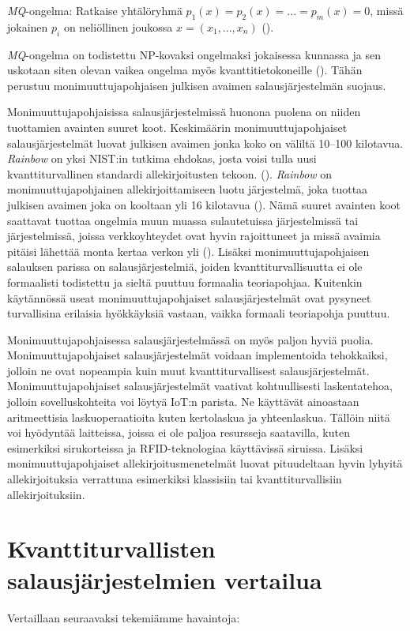 \emph{MQ}-ongelma: Ratkaise yhtälöryhmä $p_{1}(x) = p_{2}(x) = ... = p_ {m}(x) = 0$, missä jokainen $p_{i}$ on neliöllinen joukossa $x = (x_{1}, ..., x_{n})$ (\cite{Ding2009}).

\emph{MQ}-ongelma on todistettu NP-kovaksi ongelmaksi jokaisessa kunnassa ja sen uskotaan siten olevan vaikea ongelma myös kvanttitietokoneille (\cite{8012305}). Tähän perustuu monimuuttujapohjaisen julkisen avaimen salausjärjestelmän suojaus.

Monimuuttujapohjaisissa salausjärjestelmissä huonona puolena on niiden tuottamien avainten suuret koot. Keskimäärin monimuuttujapohjaiset salausjärjestelmät luovat julkisen avaimen jonka koko on väliltä 10--100 kilotavua. \emph{Rainbow} on yksi NIST:in tutkima ehdokas, josta voisi tulla uusi kvanttiturvallinen standardi allekirjoitusten tekoon. (\cite{alagic2020status}). \emph{Rainbow} on monimuuttujapohjainen allekirjoittamiseen luotu järjestelmä, joka tuottaa julkisen avaimen joka on kooltaan yli 16 kilotavua (\cite{Ding2009}). Nämä suuret avainten koot saattavat tuottaa ongelmia muun muassa sulautetuissa järjestelmissä tai järjestelmissä, joissa verkkoyhteydet ovat hyvin rajoittuneet ja missä avaimia pitäisi lähettää monta kertaa verkon yli (\cite{8012305}). Lisäksi monimuuttujapohjaisen salauksen parissa on salausjärjestelmiä, joiden kvanttiturvallisuutta ei ole formaalisti todistettu ja sieltä puuttuu formaalia teoriapohjaa. Kuitenkin käytännössä useat monimuuttujapohjaiset salausjärjestelmät ovat pysyneet turvallisina erilaisia hyökkäyksiä vastaan, vaikka formaali teoriapohja puuttuu.

Monimuuttujapohjaisessa salausjärjestelmässä on myös paljon hyviä puolia. Monimuuttujapohjaiset salausjärjestelmät voidaan implementoida tehokkaiksi, jolloin ne ovat nopeampia kuin muut kvanttiturvallisest salausjärjestelmät. Monimuuttujapohjaiset salausjärjestelmät vaativat kohtuullisesti laskentatehoa, jolloin sovelluskohteita voi löytyä IoT:n parista. Ne käyttävät ainoastaan aritmeettisia laskuoperaatioita kuten kertolaskua ja yhteenlaskua. Tällöin niitä voi hyödyntää laitteissa, joissa ei ole paljoa resursseja saatavilla, kuten esimerkiksi sirukorteissa ja RFID-teknologiaa käyttävissä siruissa. Lisäksi monimuuttujapohjaiset allekirjoitusmenetelmät luovat pituudeltaan hyvin lyhyitä allekirjoituksia verrattuna esimerkiksi klassisiin tai kvanttiturvallisiin allekirjoituksiin.

\section{Kvanttiturvallisten salausjärjestelmien vertailua}
Vertaillaan seuraavaksi tekemiämme havaintoja:

